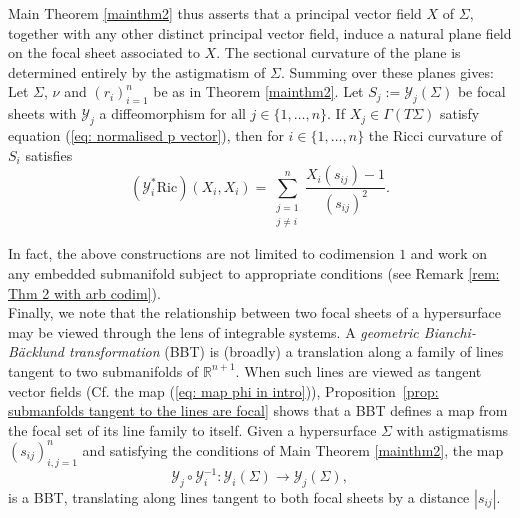 \documentclass[12pt]{amsart}
\theoremstyle{plain}
\newenvironment{Mainthm}[1]{%
  \IfBlankTF{#1}
    {\renewcommand{\theMainthminner}{\unskip}}
    {\renewcommand\theMainthminner{#1}}%
  \Mainthminner
}{\endMainthminner}
\theoremstyle{definition}
\def\R{\mathbb{R}}
\numberwithin{equation}{section}
\begin{document}
Main Theorem \ref{mainthm2} thus asserts that a principal vector field $X$ of $\Sigma$, together with any other distinct principal vector field, induce a natural plane field on the focal sheet associated to $X$. The sectional curvature of the plane is determined entirely by the astigmatism of $\Sigma$. Summing over these planes gives:
\begin{Mainthm}{3}\label{mainthm3}
    Let $\Sigma$, $\nu$ and $(r_i)_{i=1}^n$ be as in Theorem \ref{mainthm2}. Let $S_j:=\mathcal{Y}_j(\Sigma)$ be focal sheets with $\mathcal{Y}_j$ a diffeomorphism for all $j\in\{1,\ldots,n\}$. If $X_j\in\Gamma(T\Sigma)$ satisfy equation (\ref{eq: normalised p vector}), then for $i\in\{1,\ldots,n\}$ the Ricci curvature of $S_i$ satisfies
    \[
    (\mathcal{Y}_i^\ast\mathrm{Ric})(X_i,X_i)=\sum_{\substack{j=1\\j\neq i}}^n\frac{X_i(s_{ij})-1}{(s_{ij})^2}.
    \]
\end{Mainthm}

In fact, the above constructions are not limited to codimension $1$ and work on any embedded submanifold subject to appropriate conditions (see Remark \ref{rem: Thm 2 with arb codim}).\\

Finally, we note that the relationship between two focal sheets of a hypersurface may be viewed through the lens of integrable systems. A \textit{geometric Bianchi-B\"acklund transformation} (BBT) is (broadly) a translation along a family of lines tangent to two submanifolds of $\R^{n+1}$. When such lines are viewed as tangent vector fields (Cf. the map (\ref{eq: map phi in intro})), \mbox{Proposition \ref{prop: submanfolds tangent to the lines are focal}} shows that a BBT defines a map from the focal set of its line family to itself. Given a hypersurface $\Sigma$ with astigmatisms $(s_{ij})_{i,j=1}^n$ and satisfying the conditions of Main Theorem \ref{mainthm2}, the map
\begin{equation}\label{equ: map between focal}
\mathcal{Y}_j\circ\mathcal{Y}_i^{-1}: \mathcal{Y}_i(\Sigma) \to \mathcal{Y}_j(\Sigma),
\end{equation}
is a BBT, translating along lines tangent to both focal sheets by a distance $|s_{ij}|$.\\
\end{document}
